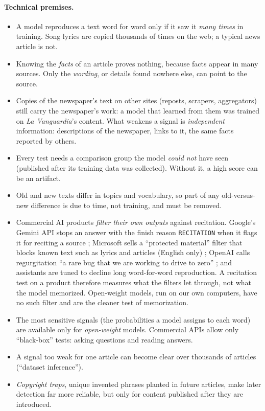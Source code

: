 \documentclass[10pt,a4paper]{article}
\begin{document}
\paragraph{Technical premises.}
\begin{itemize}
\item A model reproduces a text word for word only if it saw it \emph{many times} in training. Song lyrics are copied
thousands of times on the web; a typical news article is not.
\item Knowing the \emph{facts} of an article proves nothing, because facts appear in many sources. Only the
\emph{wording}, or details found nowhere else, can point to the source.
\item Copies of the newspaper's text on other sites (reposts, scrapers, aggregators) still carry the newspaper's
work: a model that learned from them was trained on \emph{La Vanguardia}'s content. What weakens a signal is
\emph{independent} information: descriptions of the newspaper, links to it, the same facts reported by others.
\item Every test needs a comparison group the model \emph{could not} have seen (published after its training data was
collected). Without it, a high score can be an artifact.
\item Old and new texts differ in topics and vocabulary, so part of any old-versus-new difference is due to time, not
training, and must be removed.
\item Commercial AI products \emph{filter their own outputs} against recitation. Google's Gemini API stops an answer
with the finish reason \texttt{RECITATION} when it flags it for reciting a source \cite{geminifinish}; Microsoft sells a
``protected material'' filter that blocks known text such as lyrics and articles (English only) \cite{azurepm}; OpenAI
calls regurgitation ``a rare bug that we are working to drive to zero'' \cite{openaijournalism}; and assistants are
tuned to decline long word-for-word reproduction. A recitation test on a product therefore measures what the filters
let through, not what the model memorized. Open-weight models, run on our own computers, have no such filter and are
the cleaner test of memorization.
\item The most sensitive signals (the probabilities a model assigns to each word) are available only for
\emph{open-weight} models. Commercial APIs allow only ``black-box'' tests: asking questions and reading answers.
\item A signal too weak for one article can become clear over thousands of articles (``dataset inference'').
\item \emph{Copyright traps}, unique invented phrases planted in future articles, make later detection far more
reliable, but only for content published after they are introduced.
\end{itemize}
\end{document}
